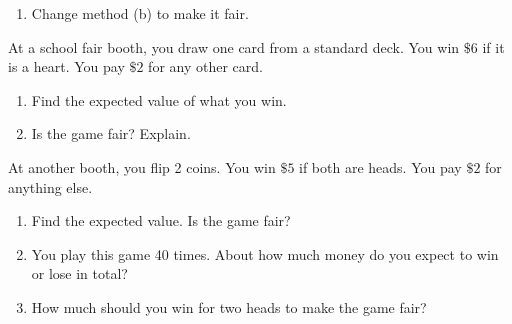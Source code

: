 \documentclass[11pt]{article}
\begin{document}
\begin{enumerate}[resume]
\begin{enumerate}[itemsep=1em]
  \work{3em}
  \item Change method (b) to make it fair.

  \work{2em}
\end{enumerate}

\vspace{0.4em}
At a school fair booth, you draw one card from a standard deck. You win $\$6$ if it is a heart. You pay $\$2$ for any other card.
\begin{enumerate}[start=6,itemsep=1em]
  \item Find the expected value of what you win.

  \work{3em}
  \item Is the game fair? Explain. 
  \work{2em}
\end{enumerate}

\vspace{0.4em}
At another booth, you flip 2 coins. You win $\$5$ if both are heads. You pay $\$2$ for anything else.
\begin{enumerate}[start=8,itemsep=1em]
  \item Find the expected value. Is the game fair?

  \work{3em}
  \item You play this game 40 times. About how much money do you expect to win or lose in total?

  \work{2.5em}
  \item How much should you win for two heads to make the game fair?

\end{enumerate}

\end{enumerate}
\end{document}
